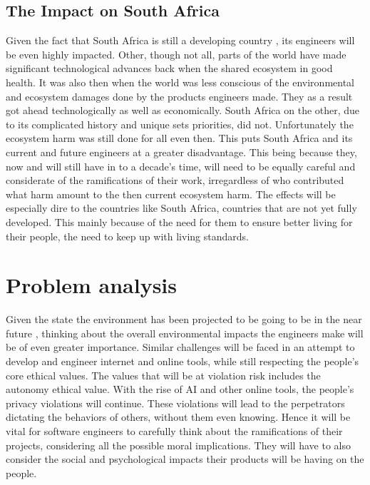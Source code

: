 \documentclass[12pt]{witseiepaper}
\begin{document}

    \subsection{The Impact on South Africa} 

    Given the fact that South Africa is still a developing country \cite{bakari2018south}, its engineers will be even highly impacted. Other, though not all, parts of the world have made significant technological advances back when the shared ecosystem in good health. It was also then when the world was less conscious of the environmental and ecosystem damages done by the products engineers made. They as a result got ahead technologically as well as economically. South Africa on the other, due to its complicated history and unique sets priorities, did not. Unfortunately the ecosystem harm was still done for all even then. This puts South Africa and its current and future engineers at a greater disadvantage. This being because they, now and will still have in to a decade’s time, will need to be equally careful and considerate of the ramifications of their work, irregardless of who contributed what harm amount to the then current ecosystem harm. 
    The effects will be especially dire to the countries like South Africa, countries that are not yet fully developed. This mainly because of the need for them to ensure better living for their people, the need to keep up with living standards. 
    



\section{Problem analysis}

Given the state the environment has been projected to be going to be in the near future \cite{collins2014long}, thinking about the overall environmental impacts the engineers make will be of even greater importance. Similar challenges will be faced in an attempt to develop and engineer internet and online tools, while still respecting the people's core ethical values. 
The values that will be at violation risk includes the autonomy ethical value. With the rise of AI and other online tools, the people's privacy violations will continue. These violations will lead to the perpetrators dictating the behaviors of others, without them even knowing. Hence it will be vital for software engineers to carefully think about the ramifications of their projects, considering all the possible moral implications. They will have to also consider the social and psychological impacts their products will be having on the people. 
\end{document}
